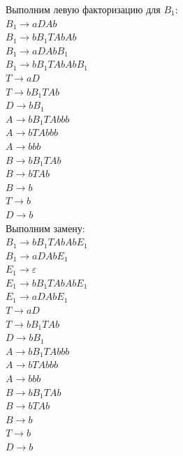 \documentclass[a4paper,14pt]{extarticle}
\begin{document}
\begin{enumerate}[1.]
Выполним левую факторизацию для $B_1$:\\
$B_1 \rightarrow aDAb$\\
$B_1 \rightarrow bB_1TAbAb$\\
$B_1 \rightarrow aDAbB_1$\\
$B_1 \rightarrow bB_1TAbAbB_1$\\
$T \rightarrow aD$\\ 
$T \rightarrow bB_1TAb$\\
$D \rightarrow bB_1$\\
$A \rightarrow bB_1TAbbb$\\
$A \rightarrow bTAbbb$\\
$A \rightarrow bbb$\\
$B \rightarrow bB_1TAb$\\ 
$B \rightarrow bTAb$\\ 
$B \rightarrow b$\\
$T \rightarrow b$\\
$D \rightarrow b$\\

Выполним замену:\\
$B_1 \rightarrow bB_1TAbAbE_1$\\
$B_1 \rightarrow aDAbE_1$\\
$E_1 \rightarrow \varepsilon$\\
$E_1 \rightarrow bB_1TAbAbE_1$\\
$E_1 \rightarrow aDAbE_1$\\
$T \rightarrow aD$\\ 
$T \rightarrow bB_1TAb$\\
$D \rightarrow bB_1$\\
$A \rightarrow bB_1TAbbb$\\
$A \rightarrow bTAbbb$\\
$A \rightarrow bbb$\\
$B \rightarrow bB_1TAb$\\ 
$B \rightarrow bTAb$\\ 
$B \rightarrow b$\\
$T \rightarrow b$\\
$D \rightarrow b$\\


\end{enumerate}
\end{document}
